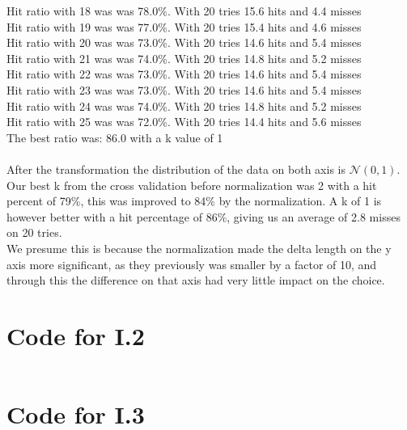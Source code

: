 \documentclass{article}
\begin{document}
Hit ratio with 18 was was 78.0\%. With 20 tries 15.6 hits and 4.4 misses\\
Hit ratio with 19 was was 77.0\%. With 20 tries 15.4 hits and 4.6 misses\\
Hit ratio with 20 was was 73.0\%. With 20 tries 14.6 hits and 5.4 misses\\
Hit ratio with 21 was was 74.0\%. With 20 tries 14.8 hits and 5.2 misses\\
Hit ratio with 22 was was 73.0\%. With 20 tries 14.6 hits and 5.4 misses\\
Hit ratio with 23 was was 73.0\%. With 20 tries 14.6 hits and 5.4 misses\\
Hit ratio with 24 was was 74.0\%. With 20 tries 14.8 hits and 5.2 misses\\
Hit ratio with 25 was was 72.0\%. With 20 tries 14.4 hits and 5.6 misses\\
The best ratio was: 86.0 with a k value of 1\\\\
After the transformation the distribution of the data on both axis is $\mathscr{N}(0,1)$. Our best k from the 
cross validation before normalization was 2 with a hit percent of 79\%, this was improved to 84\% by the normalization. 
A k of 1 is however better with a hit percentage of 86\%, giving us an average of 2.8 misses on 20 tries.\\
We presume this is because the normalization made the delta length on the y axis more significant, as they previously was smaller by a factor of 10,
and through this the difference on that axis had very little impact on the choice.

\newpage
\begin{appendices}

\section{Code for I.2}

\inputminted{matlab}{matlab.m}

\section{Code for I.3}

\inputminted{python}{part2/neighborJohn.py}

\end{appendices}
\end{document}
